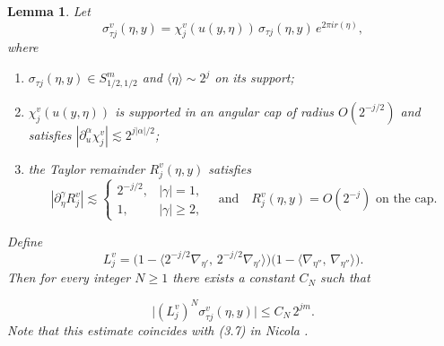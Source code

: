 \documentclass[12pt, reqno]{amsart}
\newtheorem{lemma}[theorem]{Lemma}
\theoremstyle{definition}
\theoremstyle{remark}
\numberwithin{equation}{section}
\begin{document}
\begin{lemma}
Let
\[
\sigma_{\tau j}^v(\eta,y)
= \chi_j^v(u(y,\eta))\,\sigma_{\tau j}(\eta,y)\,e^{2\pi i r(\eta)},
\]
where
\begin{enumerate}
  \item $\sigma_{\tau j}(\eta,y)\in S^{m}_{1/2,1/2}$ and 
        $\langle\eta\rangle\sim 2^j$ on its support;
  \item $\chi_j^v(u(y,\eta))$ is supported in an angular cap of radius $O(2^{-j/2})$
        and satisfies $|\partial_u^\alpha \chi_j^v|\lesssim 2^{j|\alpha|/2}$;
  \item the Taylor remainder $R_j^v(\eta,y)$ satisfies 
        \[
        |\partial_\eta^\gamma R_j^v|\lesssim 
        \begin{cases}
        2^{-j/2}, & |\gamma|=1,\\[4pt]
        1, & |\gamma|\ge2,
        \end{cases}
        \quad\text{and}\quad
        R_j^v(\eta,y)=O(2^{-j}) 
        \text{ on the cap}.
        \]
\end{enumerate}
Define
\[
L_j^v=
\Big(1-\langle 2^{-j/2}\nabla_{\eta'},\,2^{-j/2}\nabla_{\eta'}\rangle\Big)
\Big(1-\langle\nabla_{\eta''},\,\nabla_{\eta''}\rangle\Big).
\]
Then for every integer $N\ge1$ there exists a constant $C_N$ such that

\[
\big|(L_j^v)^N \sigma_{\tau j}^v(\eta,y)\big|
\le C_N\,2^{jm}.
\] Note that this estimate coincides with (3.7) in Nicola \cite{Nicola2010}.
\end{lemma}
\end{document}
